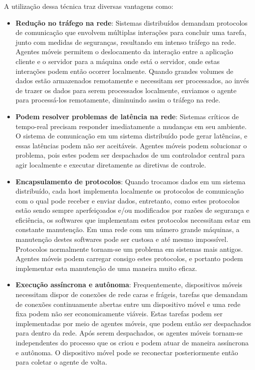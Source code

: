 A utilização dessa técnica traz diversas vantagens como:
\begin{itemize}
	\item \textbf{Redução no tráfego na rede}: Sistemas distribuídos demandam protocolos de comunicação que envolvem múltiplas interações para concluir uma tarefa, junto com medidas de seguranças, resultando em intenso tráfego na rede. Agentes móveis permitem o deslocamento da interação entre a aplicação cliente e o servidor para a máquina onde está o servidor, onde estas interações podem então ocorrer localmente. Quando grandes volumes de dados estão armazenados remotamente e necessitam ser processados, ao invés de trazer os dados para serem processados localmente, enviamos o agente para processá-los remotamente, diminuindo assim o tráfego na rede.

	\item \textbf{Podem resolver problemas de latência na rede}: Sistemas críticos de tempo-real precisam responder imediatamente a mudanças em seu ambiente. O sistema de comunicação em um sistema distribuído pode gerar latências, e essas latências podem não ser aceitáveis. Agentes móveis podem solucionar o problema, pois estes podem ser despachados de um controlador central para agir localmente e executar diretamente as diretivas de controle.

	\item \textbf{Encapsulamento de protocolos}: Quando trocamos dados em um sistema distribuído, cada host implementa localmente os protocolos de comunicação com o qual pode receber e enviar dados, entretanto, como estes protocolos estão sendo sempre aperfeiçoados e/ou modificados por razões de segurança e eficiência, os softwares que implementam estes protocolos necessitam estar em constante manutenção. Em uma rede com um número grande máquinas, a manutenção destes softwares pode ser custosa e até mesmo impossível. Protocolos normalmente tornam-se um problema em sistemas mais antigos. Agentes móveis podem carregar consigo estes protocolos, e portanto podem implementar esta manutenção de uma maneira muito eficaz.

	\item \textbf{Execução assíncrona e autônoma}: Frequentemente, dispositivos móveis necessitam dispor de conexões de rede caras e frágeis, tarefas que demandam de conexões continuamente abertas entre um dispositivo móvel e uma rede fixa podem não ser economicamente viáveis. Estas tarefas podem ser implementadas por meio de agentes móveis, que podem então ser despachados para dentro da rede. Após serem despachados, os agentes móveis tornam-se independentes do processo que os criou e podem atuar de maneira assíncrona e autônoma. O dispositivo móvel pode se reconectar posteriormente então para coletar o agente de volta.


\end{itemize}
